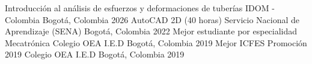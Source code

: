


\begin{cvhonors}

\cvhonor
    {Introducción al análisis de esfuerzos y deformaciones de tuberías} %
    {IDOM - Colombia} %
    {Bogotá, Colombia} %
    {2026} %
\cvhonor
    {AutoCAD 2D (40 horas)} %
    {Servicio Nacional de Aprendizaje (SENA)} %
    {Bogotá, Colombia} %
    {2022} %
\cvhonor
    {Mejor estudiante por especialidad Mecatrónica} %
    {Colegio OEA I.E.D} %
    {Bogotá, Colombia} %
    {2019} %
\cvhonor
    {Mejor ICFES Promoción 2019} %
    {Colegio OEA I.E.D} %
    {Bogotá, Colombia} %
    {2019} %


\end{cvhonors}
